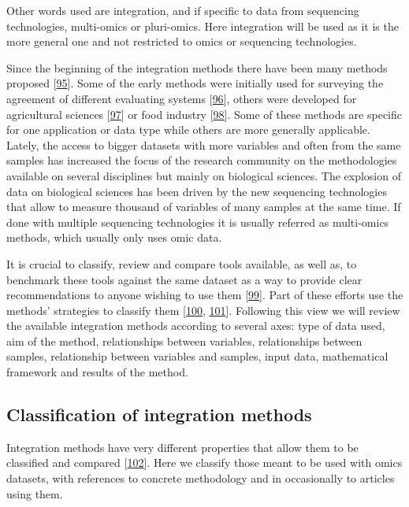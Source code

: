 \documentclass[
  12pt,
  a4paper,
  twoside,
  openright]{book}
\begin{document}
Other words used are integration, and if specific to data from sequencing technologies, multi-omics or pluri-omics.
Here integration will be used as it is the more general one and not restricted to omics or sequencing technologies.

Since the beginning of the integration methods there have been many methods proposed {[}\protect\hyperlink{ref-krassowski2020}{95}{]}.
Some of the early methods were initially used for surveying the agreement of different evaluating systems {[}\protect\hyperlink{ref-yannakoudakis2015}{96}{]}, others were developed for agricultural sciences {[}\protect\hyperlink{ref-hotelling1936}{97}{]} or food industry {[}\protect\hyperlink{ref-biancolillo}{98}{]}.
Some of these methods are specific for one application or data type while others are more generally applicable.
Lately, the access to bigger datasets with more variables and often from the same samples has increased the focus of the research community on the methodologies available on several disciplines but mainly on biological sciences.
The explosion of data on biological sciences has been driven by the new sequencing technologies that allow to measure thousand of variables of many samples at the same time.
If done with multiple sequencing technologies it is usually referred as multi-omics methods, which usually only uses omic data.

It is crucial to classify, review and compare tools available, as well as, to benchmark these tools against the same dataset as a way to provide clear recommendations to anyone wishing to use them {[}\protect\hyperlink{ref-wu_selective_2019}{99}{]}.
Part of these efforts use the methods' strategies to classify them {[}\protect\hyperlink{ref-cavill2016}{100}, \protect\hyperlink{ref-chongComputationalApproachesIntegrative2017}{101}{]}.
Following this view we will review the available integration methods according to several axes: type of data used, aim of the method, relationships between variables, relationships between samples, relationship between variables and samples, input data, mathematical framework and results of the method.

\hypertarget{classification-of-integration-methods}{%
\subsection{Classification of integration methods}\label{classification-of-integration-methods}}

Integration methods have very different properties that allow them to be classified and compared {[}\protect\hyperlink{ref-huang2017}{102}{]}.
Here we classify those meant to be used with omics datasets, with references to concrete methodology and in occasionally to articles using them.
\end{document}
